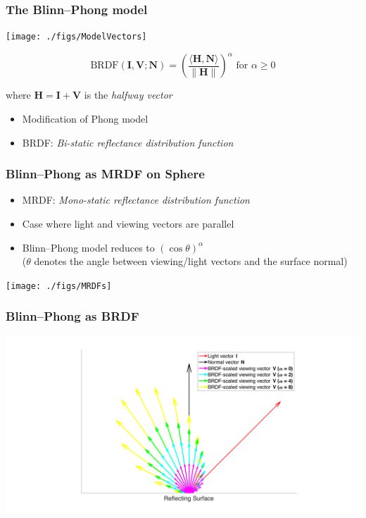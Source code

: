 \documentclass{beamer}
\begin{document}
\begin{frame}[t]
\frametitle{The Blinn--Phong model}
\centerline{\texttt{[image: ./figs/ModelVectors]}}
\begin{tcolorbox}
$$\text{BRDF}(\mathbf{I},\mathbf{V};\mathbf{N}) = \left(\frac{\langle\mathbf{H},\mathbf{N}\rangle}{\|\mathbf{H}\|}\right)^\alpha \text{ for } \alpha \geq 0$$
\centerline{where $\mathbf{H} = \mathbf{I} + \mathbf{V}$ is the \textit{halfway vector}}
\end{tcolorbox}
\begin{itemize}
\item Modification of Phong model
\item BRDF: \textit{Bi-static reflectance distribution function}
\end{itemize}
\end{frame}

\begin{frame}[t]
\frametitle{Blinn--Phong as MRDF on Sphere}
\begin{itemize}
\item MRDF: \textit{Mono-static reflectance distribution function}
\item Case where light and viewing vectors are parallel
\item Blinn--Phong model reduces to $(\cos\theta)^\alpha$ \\
($\theta$ denotes the angle between viewing/light vectors and the surface normal)

\vspace*{0.25 in} 
\end{itemize}
\centerline{\texttt{[image: ./figs/MRDFs]}}
\end{frame}

\begin{frame}
\frametitle{Blinn--Phong as BRDF}
\centerline{\includegraphics[scale=0.4]{./figs/BRDF_Vectors.pdf}}
\end{frame}
\end{document}
